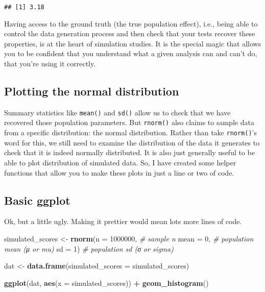 \documentclass[
]{article}
\newenvironment{Shaded}{\begin{snugshade}}{\end{snugshade}}
\newcommand{\AttributeTok}[1]{\textcolor[rgb]{0.13,0.29,0.53}{#1}}
\newcommand{\CommentTok}[1]{\textcolor[rgb]{0.56,0.35,0.01}{\textit{#1}}}
\newcommand{\DecValTok}[1]{\textcolor[rgb]{0.00,0.00,0.81}{#1}}
\newcommand{\FunctionTok}[1]{\textcolor[rgb]{0.13,0.29,0.53}{\textbf{#1}}}
\newcommand{\NormalTok}[1]{#1}
\newcommand{\OtherTok}[1]{\textcolor[rgb]{0.56,0.35,0.01}{#1}}
\newcommand{\SpecialCharTok}[1]{\textcolor[rgb]{0.81,0.36,0.00}{\textbf{#1}}}
\begin{document}
\begin{verbatim}
## [1] 3.18
\end{verbatim}

Having access to the ground truth (the true population effect), i.e.,
being able to control the data generation process and then check that
your tests recover these properties, is at the heart of simulation
studies. It is the special magic that allows you to be confident that
you understand what a given analysis can and can't do, that you're using
it correctly.

\hypertarget{plotting-the-normal-distribution}{%
\subsection{Plotting the normal
distribution}\label{plotting-the-normal-distribution}}

Summary statistics like \texttt{mean()} and \texttt{sd()} allow us to
check that we have recovered those population parameters. But
\texttt{rnorm()} also claims to sample data from a specific
distribution: the normal distribution. Rather than take
\texttt{rnorm()}'s word for this, we still need to examine the
distribution of the data it generates to check that it is indeed
normally distributed. It is also just generally useful to be able to
plot distribution of simulated data. So, I have created some helper
functions that allow you to make these plots in just a line or two of
code.

\hypertarget{basic-ggplot}{%
\subsection{Basic ggplot}\label{basic-ggplot}}

Ok, but a little ugly. Making it prettier would mean lots more lines of
code.

\begin{Shaded}
\begin{Highlighting}[]
\NormalTok{simulated\_scores }\OtherTok{\textless{}{-}} 
  \FunctionTok{rnorm}\NormalTok{(}\AttributeTok{n =} \DecValTok{1000000}\NormalTok{, }\CommentTok{\# sample n}
        \AttributeTok{mean =} \DecValTok{0}\NormalTok{, }\CommentTok{\# population mean (μ or mu)}
        \AttributeTok{sd =} \DecValTok{1}\NormalTok{) }\CommentTok{\# population sd (σ or sigma)}

\NormalTok{dat }\OtherTok{\textless{}{-}} \FunctionTok{data.frame}\NormalTok{(}\AttributeTok{simulated\_scores =}\NormalTok{ simulated\_scores)}

\FunctionTok{ggplot}\NormalTok{(dat, }\FunctionTok{aes}\NormalTok{(}\AttributeTok{x =}\NormalTok{ simulated\_scores)) }\SpecialCharTok{+}
  \FunctionTok{geom\_histogram}\NormalTok{()}
\end{Highlighting}
\end{Shaded}
\end{document}
